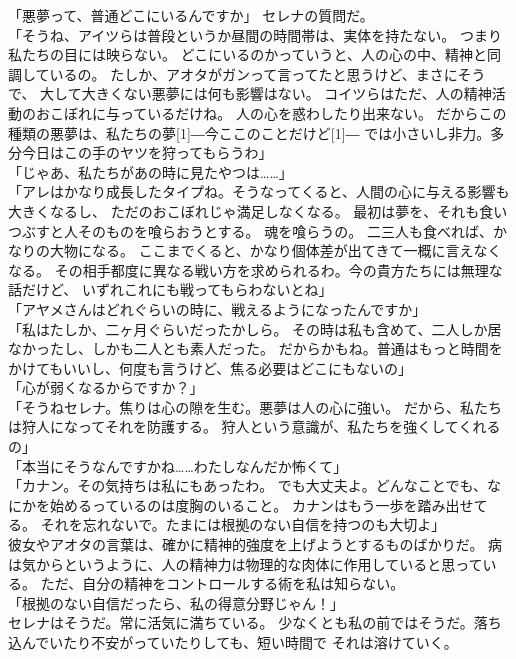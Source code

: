 \documentclass[../IHMain]{subfiles}
\begin{document}
「悪夢って、普通どこにいるんですか」
セレナの質問だ。\\
「そうね、アイツらは普段というか昼間の時間帯は、実体を持たない。
つまり私たちの目には映らない。
どこにいるのかっていうと、人の心の中、精神と同調しているの。
たしか、アオタがガンって言ってたと思うけど、まさにそうで、
大して大きくない悪夢には何も影響はない。
コイツらはただ、人の精神活動のおこぼれに与っているだけね。
人の心を惑わしたり出来ない。
だからこの種類の悪夢は、私たちの夢\scalebox{3}[1]{―}今ここのことだけど\scalebox{3}[1]{―}
では小さいし非力。多分今日はこの手のヤツを狩ってもらうわ」\\
「じゃあ、私たちがあの時に見たやつは……」\\
「アレはかなり成長したタイプね。そうなってくると、人間の心に与える影響も大きくなるし、
ただのおこぼれじゃ満足しなくなる。
最初は夢を、それも食いつぶすと人そのものを喰らおうとする。
魂を喰らうの。
二三人も食べれば、かなりの大物になる。
ここまでくると、かなり個体差が出てきて一概に言えなくなる。
その相手都度に異なる戦い方を求められるわ。今の貴方たちには無理な話だけど、
いずれこれにも戦ってもらわないとね」\\
「アヤメさんはどれぐらいの時に、戦えるようになったんですか」\\
「私はたしか、二ヶ月ぐらいだったかしら。
その時は私も含めて、二人しか居なかったし、しかも二人とも素人だった。
だからかもね。普通はもっと時間をかけてもいいし、何度も言うけど、焦る必要はどこにもないの」\\
「心が弱くなるからですか？」\\
「そうねセレナ。焦りは心の隙を生む。悪夢は人の心に強い。
だから、私たちは狩人になってそれを防護する。
狩人という意識が、私たちを強くしてくれるの」\\
「本当にそうなんですかね……わたしなんだか怖くて」\\
「カナン。その気持ちは私にもあったわ。
でも大丈夫よ。どんなことでも、なにかを始めるっているのは度胸のいること。
カナンはもう一歩を踏み出せてる。
それを忘れないで。たまには根拠のない自信を持つのも大切よ」\\
彼女やアオタの言葉は、確かに精神的強度を上げようとするものばかりだ。
病は気からというように、人の精神力は物理的な肉体に作用していると思っている。
ただ、自分の精神をコントロールする術を私は知らない。\\
「根拠のない自信だったら、私の得意分野じゃん！」\\
セレナはそうだ。常に活気に満ちている。
少なくとも私の前ではそうだ。落ち込んでいたり不安がっていたりしても、短い時間で
それは溶けていく。\\
\end{document}
